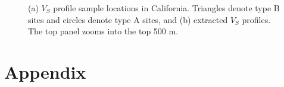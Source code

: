 \clearpage
{}
\begin{figure}[!ht]
   \hfil
  \caption{ (a) $V_S$ profile sample locations in California. Triangles denote type B sites and circles denote type A sites, and (b) extracted $V_S$ profiles. The top panel zooms into the top 500 m. }
  \label{fig:vs30-14}
\end{figure}


\setcounter{table}{0}
\setcounter{figure}{0}
\renewcommand{\thetable}{S\arabic{chapter}.\arabic{table}}
\renewcommand{\thefigure}{S\arabic{chapter}.\arabic{figure}}
\newpage
\section*{Appendix}



